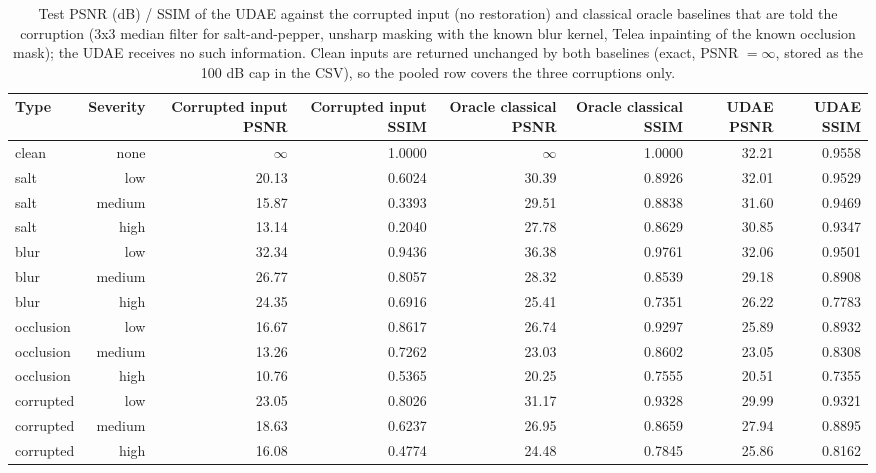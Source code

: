 \begin{table}[t]
\centering
\caption{Test PSNR (dB) / SSIM of the UDAE against the corrupted input (no restoration) and classical oracle baselines that are told the corruption (3x3 median filter for salt-and-pepper, unsharp masking with the known blur kernel, Telea inpainting of the known occlusion mask); the UDAE receives no such information. Clean inputs are returned unchanged by both baselines (exact, PSNR $=\infty$, stored as the 100 dB cap in the CSV), so the pooled row covers the three corruptions only.}
\label{tab:task1_comparison_by_type_level}
\begin{tabular}{lrrrrrrr}
\toprule
Type & Severity & Corrupted input PSNR & Corrupted input SSIM & Oracle classical PSNR & Oracle classical SSIM & UDAE PSNR & UDAE SSIM \\
\midrule
clean & none & $\infty$ & 1.0000 & $\infty$ & 1.0000 & 32.21 & 0.9558 \\
salt & low & 20.13 & 0.6024 & 30.39 & 0.8926 & 32.01 & 0.9529 \\
salt & medium & 15.87 & 0.3393 & 29.51 & 0.8838 & 31.60 & 0.9469 \\
salt & high & 13.14 & 0.2040 & 27.78 & 0.8629 & 30.85 & 0.9347 \\
blur & low & 32.34 & 0.9436 & 36.38 & 0.9761 & 32.06 & 0.9501 \\
blur & medium & 26.77 & 0.8057 & 28.32 & 0.8539 & 29.18 & 0.8908 \\
blur & high & 24.35 & 0.6916 & 25.41 & 0.7351 & 26.22 & 0.7783 \\
occlusion & low & 16.67 & 0.8617 & 26.74 & 0.9297 & 25.89 & 0.8932 \\
occlusion & medium & 13.26 & 0.7262 & 23.03 & 0.8602 & 23.05 & 0.8308 \\
occlusion & high & 10.76 & 0.5365 & 20.25 & 0.7555 & 20.51 & 0.7355 \\
corrupted & low & 23.05 & 0.8026 & 31.17 & 0.9328 & 29.99 & 0.9321 \\
corrupted & medium & 18.63 & 0.6237 & 26.95 & 0.8659 & 27.94 & 0.8895 \\
corrupted & high & 16.08 & 0.4774 & 24.48 & 0.7845 & 25.86 & 0.8162 \\
\bottomrule
\end{tabular}
\end{table}
